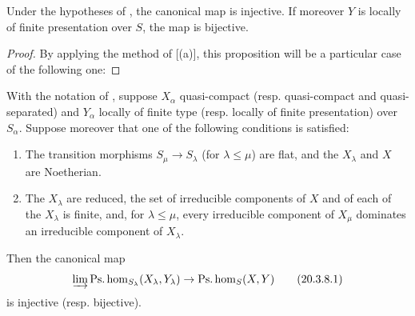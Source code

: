\begin{proposition}[20.3.7]
\label{IV.20.3.7}
Under the hypotheses of , the canonical map  is injective.
If moreover $Y$ is locally of finite presentation over $S$, the map  is bijective.
\end{proposition}

\begin{proof}
By applying the method of [(a)], this proposition will be a particular case of the following one:
\end{proof}

\begin{proposition}[20.3.8]\label{IV.20.3.8}
With the notation of , suppose $X_\alpha$ quasi-compact (resp. quasi-compact and quasi-separated) and $Y_\alpha$ locally of finite type (resp. locally of finite presentation) over $S_\alpha$.
Suppose moreover that one of the following conditions is satisfied:
\begin{enumerate}[label=\emph{(\roman*)}]
  \item The transition morphisms $S_\mu\to S_\lambda$ (for $\lambda\leq\mu$) are flat, and the $X_\lambda$ and $X$ are Noetherian.
  \item The $X_\lambda$ are reduced, the set of irreducible components of $X$ and of each of the $X_\lambda$ is finite, and, for $\lambda\leq\mu$, every irreducible component of $X_\mu$ dominates an irreducible component of $X_\lambda$.
\end{enumerate}
Then the canonical map
\[
\label{IV.20.3.8.1}
  \varinjlim\operatorname{Ps.hom}_{S_\lambda}(X_\lambda,Y_\lambda)\to\operatorname{Ps.hom}_S(X,Y)
  \tag{20.3.8.1}
\]
is injective (resp. bijective).
\end{proposition}

